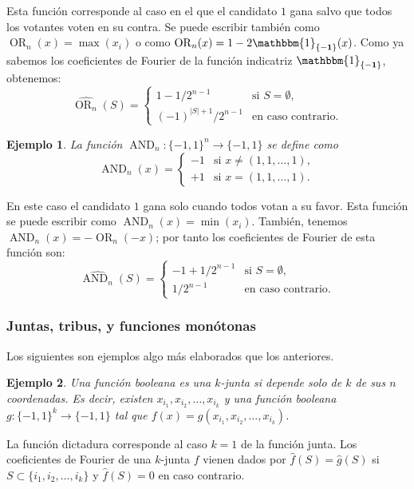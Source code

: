 \documentclass[autocontact]{gaceta}
\newtheorem{example}{Ejemplo}
\DeclareMathOperator{\AND}{AND}
\DeclareMathOperator{\OR}{OR}
\begin{document}
Esta función corresponde al caso en el que el candidato $1$ gana salvo que todos los votantes voten en su contra. Se puede escribir también como $\OR_n(x) = \max(x_i)$ o como $\OR_n (x) = 1-2\mathbbm{1}_{\{\mathbf{-1}\}}(x)$. Como ya sabemos los coeficientes de Fourier de la función indicatriz $\mathbbm{1}_{\{\mathbf{-1}\}}$, obtenemos:
\[
   \widehat{\OR_n}(S) = \begin{cases}
   1-1/2^{n-1} &\text{si } S=\emptyset,
   \\
   (-1)^{|S|+1}/2^{n-1} &\text{en caso contrario}.
   \end{cases}
\]

\begin{example}
La función $\AND_n:\{-1,1\}^n\to\{-1,1\}$ se define como
\[
   \AND_n(x) = \begin{cases}
   -1 &\text{si } x \neq (1,1,\dots, 1),
   \\
   +1 &\text{si } x = (1,1,\dots, 1).
   \end{cases}
\]
\end{example}

En este caso el candidato $1$ gana solo cuando todos votan a su favor. Esta función se puede escribir como $\AND_n(x)=\min(x_i)$. También, tenemos $\AND_n(x) = -\OR_n(-x)$; por tanto los coeficientes de Fourier de esta función son:
\[
   \widehat{\AND_n}(S) = \begin{cases}
   -1+1/2^{n-1} &\text{si } S=\emptyset,
   \\
   1/2^{n-1} &\text{en caso contrario}.
   \end{cases}
\]

\subsubsection{Juntas, tribus, y funciones monótonas}

Los siguientes son ejemplos algo más elaborados que los anteriores.

\begin{example}
Una función booleana es una $k$-junta si depende solo de $k$ de sus $n$ coordenadas. Es decir, existen $x_{i_1},x_{i_2},\dots, x_{i_k}$ y una función booleana $g : \{-1,1\}^k \to \{-1,1\}$ tal que $f(x) =g(x_{i_1},x_{i_2},\dots, x_{i_k})$.
\end{example}

La función dictadura corresponde al caso $k=1$ de la función junta.
Los coeficientes de Fourier de una $k$-junta $f$ vienen dados por $\widehat{f}(S)=\widehat{g}(S)$ si $S\subset \{i_1,i_2,\dots, i_k\}$ y $\widehat{f}(S)=0$ en caso contrario.
\end{document}
